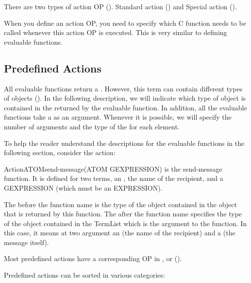 There are two types of action OP (). Standard action
() and Special action ().

When you define an action OP, you need to specify which C function needs
to be called whenever this action OP is executed. This is very similar to
defining evaluable functions.



\subsection{Predefined Actions}

All evaluable functions return a . However, this term
can contain different types of objects (). In the following
description, we will indicate which type of object is contained in the
 returned by the evaluable function. In addition, all the
evaluable functions take a  as an argument. Whenever it is
possible, we will specify the number of arguments and the type of the
 for each element.

To help the reader understand the descriptions for the evaluable functions
in the following section, consider the  action:

\begin{typeefa}{Action}{ATOM}{send-message}{(ATOM GEXPRESSION)}
is the send-message function. It is defined for two terms, an , the
name of the recipient, and a GEXPRESSION (which must be an EXPRESSION).
\end{typeefa}

The  before the function name  is the type of the
object contained in the  object that is returned by this
 function.  The  after the function
name specifies the type of the object contained in the TermList which is the
argument to the  function. In this case, it means at two
argument an  (the name of the recipient) and a 
(the message itself).

Most predefined actions have a corresponding OP in ,
 or  ().

Predefined actions can be sorted in various categories:



